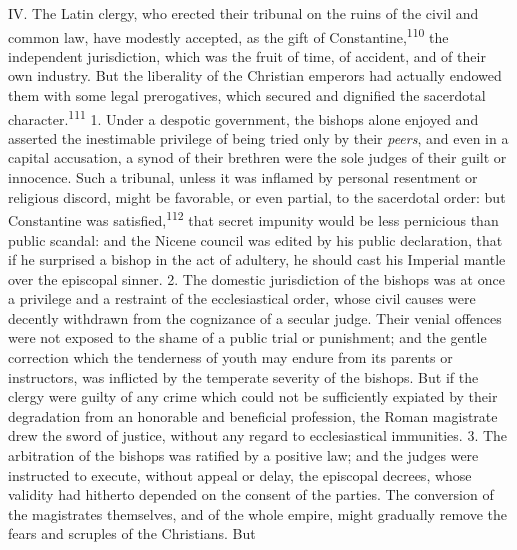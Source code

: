 
IV. The Latin clergy, who erected their tribunal on the ruins of the
civil and common law, have modestly accepted, as the gift of
Constantine,\textsuperscript{110} the independent jurisdiction, which was the fruit of
time, of accident, and of their own industry. But the liberality of the
Christian emperors had actually endowed them with some legal
prerogatives, which secured and dignified the sacerdotal character.\textsuperscript{111}
1. Under a despotic government, the bishops alone enjoyed and asserted
the inestimable privilege of being tried only by their \textit{peers}, and
even in a capital accusation, a synod of their brethren were the sole
judges of their guilt or innocence. Such a tribunal, unless it was
inflamed by personal resentment or religious discord, might be
favorable, or even partial, to the sacerdotal order: but Constantine
was satisfied,\textsuperscript{112} that secret impunity would be less pernicious than
public scandal: and the Nicene council was edited by his public
declaration, that if he surprised a bishop in the act of adultery, he
should cast his Imperial mantle over the episcopal sinner. 2. The
domestic jurisdiction of the bishops was at once a privilege and a
restraint of the ecclesiastical order, whose civil causes were decently
withdrawn from the cognizance of a secular judge. Their venial offences
were not exposed to the shame of a public trial or punishment; and the
gentle correction which the tenderness of youth may endure from its
parents or instructors, was inflicted by the temperate severity of the
bishops. But if the clergy were guilty of any crime which could not be
sufficiently expiated by their degradation from an honorable and
beneficial profession, the Roman magistrate drew the sword of justice,
without any regard to ecclesiastical immunities. 3. The arbitration of
the bishops was ratified by a positive law; and the judges were
instructed to execute, without appeal or delay, the episcopal decrees,
whose validity had hitherto depended on the consent of the parties. The
conversion of the magistrates themselves, and of the whole empire,
might gradually remove the fears and scruples of the Christians. But
